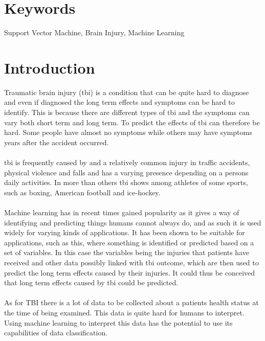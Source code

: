 \documentclass[11pt]{article}
\begin{document}
\section*{Keywords}
Support Vector Machine, Brain Injury, Machine Learning

\newpage
\tableofcontents
\newpage
\section{Introduction}
Traumatic brain injury (\gls{tbi}) is a condition that can be quite hard to diagnose and even if diagnosed the long term effects and symptoms can be hard to identify. This is because there are different types of \gls{tbi} and the symptoms can vary both short term and long term. To predict the effects of \gls{tbi} can therefore be hard. Some people have almost no symptoms while others may have symptoms years after the accident occurred.\cite{TraumaticBrainInjury2021}\cite{TraumaticBrainInjury}\\
\\
\gls{tbi} is frequently caused by and a relatively common injury in traffic accidents, physical violence and falls and has a varying presence depending on a persons daily activities. In more than others \gls{tbi} shows among athletes of some sports, such as boxing, American football and ice-hockey\cite{TraumaticBrainInjury}.\cite{TraumaticBrainInjury2021}\\
\\
Machine learning has in recent times gained popularity as it gives a way of identifying and predicting things humans cannot always do, and as such it is used widely for varying kinds of applications. It has been shown to be suitable for applications, such as this, where something is identified or predicted based on a set of variables. In this case the variables being the injuries that patients have received and other data possibly linked with \gls{tbi} outcome, which are then used to predict the long term effects caused by their injuries. It could thus be conceived that long term effects caused by \gls{tbi} could be predicted.\cite{ArtificialIntelligence2021a}\cite{MachineLearning2021}\\
\\
As for \gls{TBI} there is a lot of data to be collected about a patients health status at the time of being examined. This data is quite hard for humans to interpret. Using machine learning to interpret this data has the potential to use its capabilities of data classification.\cite{TraumaticBrainInjury2021}\cite{nielsonUncoveringPrecisionPhenotypebiomarker2017}
\end{document}
